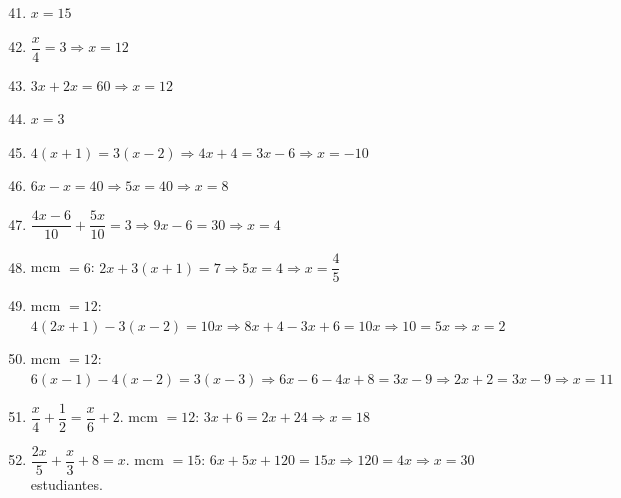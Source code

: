 \documentclass[12pt, letterpaper]{article}
\begin{document}
  \begin{enumerate}[leftmargin=*, label=\textbf{\arabic*.}]
    \setcounter{enumi}{40}
    \item $x = 15$

    \item $\dfrac{x}{4} = 3 \Rightarrow x = 12$

    \item $3x + 2x = 60 \Rightarrow x = 12$

    \item $x = 3$

    \item $4(x + 1) = 3(x - 2) \Rightarrow 4x + 4 = 3x - 6 \Rightarrow x = -10$

    \item $6x - x = 40 \Rightarrow 5x = 40 \Rightarrow x = 8$

    \item $\dfrac{4x - 6}{10} + \dfrac{5x}{10} = 3 \Rightarrow 9x - 6 = 30 \Rightarrow x = 4$

    \item mcm $= 6$: $2x + 3(x + 1) = 7 \Rightarrow 5x = 4 \Rightarrow x = \dfrac{4}{5}$

    \item mcm $= 12$: $4(2x + 1) - 3(x - 2) = 10x \Rightarrow 8x + 4 - 3x + 6 = 10x \Rightarrow 10 = 5x \Rightarrow x = 2$

    \item mcm $= 12$: $6(x - 1) - 4(x - 2) = 3(x - 3) \Rightarrow 6x - 6 - 4x + 8 = 3x - 9 \Rightarrow 2x + 2 = 3x - 9 \Rightarrow x = 11$

    \item $\dfrac{x}{4} + \dfrac{1}{2} = \dfrac{x}{6} + 2$. mcm $= 12$: $3x + 6 = 2x + 24 \Rightarrow x = 18$

    \item $\dfrac{2x}{5} + \dfrac{x}{3} + 8 = x$. mcm $= 15$: $6x + 5x + 120 = 15x \Rightarrow 120 = 4x \Rightarrow x = 30$ estudiantes.
  \end{enumerate}

\fi
\end{document}
